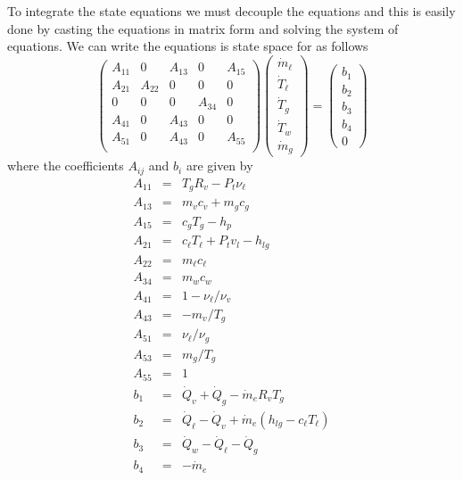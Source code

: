 To integrate the state equations we must decouple the equations and
this is easily done by casting the equations in matrix form and
solving the system of equations.  We can write the equations is
state space for as follows
%
\begin{equation}
   \left(\begin{array}{ccccccc}
   A_{11} & 0 & A_{13}  & 0 & A_{15}\\
    A_{21} & A_{22} & 0  & 0 & 0 \\
    0 & 0 & 0  & A_{34} & 0\\
    A_{41} & 0 & A_{43}  & 0 & 0\\
    A_{51} & 0 & A_{43}  & 0 &  A_{55}\\
   \end{array}\right)
   \left(\begin{array}{c}
    \dot{m}_\ell \\
    \dot{T}_\ell  \\
    \dot{T}_g \\
   \dot{T}_w  \\
   \dot{m}_g
   \end{array}\right) =
   \left(\begin{array}{c}
    b_1\\
    b_2  \\
    b_3 \\
    b_4  \\
    0
   \end{array}\right)
\end{equation}
%
where the coefficients $A_{ij}$ and $b_i$ are given by
%
\begin{eqnarray}
   A_{11}& = & T_g R_v - P_t \nu_\ell \label{Eq:RegulatedA11}\\
   A_{13}& = & m_v c_v + m_g c_g\\
   A_{15} & = & c_g T_g - h_p\\
   A_{21} & = & c_\ell T_\ell + P_t v_l - h_{lg}\\
   A_{22} & = & m_\ell c_\ell\\
   A_{34} & = & m_w c_w\\
   A_{41} & = & 1  - \nu_\ell/\nu_v\\
   A_{43} & = & - m_v/T_g\\
   A_{51} & = & \nu_\ell/\nu_g\\
   A_{53} & = & m_g/T_g \\
   A_{55} & = & 1 \\
   b_1 & = & \dot{Q}_v + \dot{Q}_g - \dot{m}_e R_v T_g \label{Eq:Regulatedb1}\\
   b_2 & = & \dot{Q}_\ell - \dot{Q}_v + \dot{m}_e (h_{lg} - c_\ell T_\ell)\\
   b_3 & = & \dot{Q}_w -\dot{Q}_\ell - \dot{Q}_g\\
   b_4 & = & -\dot{m}_e \label{Eq:Regulatedb4}
\end{eqnarray}

